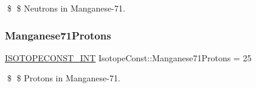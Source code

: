 \$ \$ Neutrons in Manganese-\/71. \mbox{\label{group___isotope_const-_manganese-_mn71_ga69b8ecfa4c979a82462fb73aa1c97448}} 
\subsubsection{\texorpdfstring{Manganese71\+Protons}{Manganese71Protons}}
{\footnotesize\ttfamily \mbox{\hyperlink{group___isotope_const-_macros_ga5f18360b3e99483a35c32d789e62621c}{I\+S\+O\+T\+O\+P\+E\+C\+O\+N\+S\+T\+\_\+\+I\+NT}} Isotope\+Const\+::\+Manganese71\+Protons = 25}

\$ \$ Protons in Manganese-\/71. 